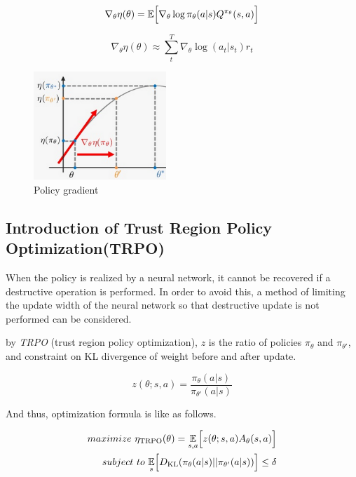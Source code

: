 \[
\nabla_\theta \eta(\theta)=\mathbb{E}\Bigl[ \nabla_\theta \log \pi_\theta(a|s) Q^{\pi_\theta}(s,a)   \Bigr]
\]

\[
\nabla_\theta \eta(\theta) \approx \sum_{t}^{T} \nabla_\theta \log (a_t|s_t)r_t
\]



\begin{figure}[H]
\begin{center}
\includegraphics[width=5cm]{./figures/example_policy_gradient.png}
\caption{Policy gradient}
\label{fig:example_gridworld}
\end{center}
\end{figure}


\subsection{Introduction of Trust Region Policy Optimization(TRPO)}

When the policy is realized by a neural network, it cannot be recovered if a destructive operation is performed.
In order to avoid this, a method of limiting the update width of the neural network so that destructive update is not performed can be considered.

by {\it TRPO} (trust region policy optimization), $z$ is the ratio of policies $\pi_\theta$ and $\pi_{\theta'}$, and constraint on KL divergence of weight before and after update.

\[
z(\theta;s,a) = \frac{\pi_{\theta}(a|s)}{\pi_{\theta'}(a|s)}
\]

And thus, optimization formula is like as follows.

\begin{eqnarray*}
maximize ~\eta_{\mathrm{TRPO}}(\theta) = \underset{s,a}{\mathbb{E}}\Bigl[  z(\theta;s,a)A_{\theta}(s,a) \Bigr] \\
subject ~to~  \underset{s}{\mathbb{E}}\Bigl[ D_{\mathrm{KL}}(\pi_{\theta}(a|s)||\pi_{\theta'}(a|s)) \Bigr]  \leq \delta
\end{eqnarray*}


